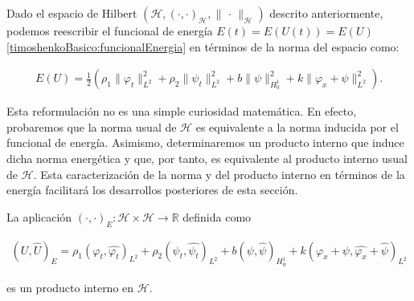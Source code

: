 Dado el espacio de Hilbert $(\mathcal{H}, (\cdot, \cdot)_{\mathcal{H}}, \lVert \, \cdot \, \rVert_{\mathcal{H}})$ descrito anteriormente, podemos reescribir el funcional de energía $E(t) = E(U(t)) = E(U)$ \eqref{timoshenkoBasico:funcionalEnergia} en términos de la norma del espacio como:

\begin{align}
    \label{timoshenkoBasico:funcionalEnergiaNorma}
    E(U) = \frac{1}{2}\left( \rho_1 \lVert \varphi_t \rVert^2_{L^2} + \rho_2 \lVert \psi_t \rVert_{L^2}^2 + b \lVert \psi \rVert_{H_0^1}^2 + k \lVert \varphi_x + \psi \rVert_{L^2}^2 \right).
\end{align}

Esta reformulación no es una simple curiosidad matemática. En efecto, 
probaremos que la norma usual de \(\mathcal{H}\) es equivalente a la 
norma inducida por el funcional de energía. Asimismo, determinaremos 
un producto interno que induce dicha norma energética y que, por tanto, 
es equivalente al producto interno usual de \(\mathcal{H}\). Esta 
caracterización de la norma y del producto interno en términos de la 
energía facilitará los desarrollos posteriores de esta sección.\\

\begin{Proposicion}
    \label{ch:teoriaVigas:prop:ProdInternoEnergia}

    La aplicación $(\cdot, \cdot)_{E} : \mathcal{H} \times \mathcal{H} \rightarrow \mathbb{R}$ definida como

    \begin{align}
        \label{prodInternoEnergiaH}
        (U, \hat{U})_{E} = \rho_1 (\varphi_t, \hat{\varphi_t})_{L^2} + \rho_2 (\psi_t, \hat{\psi_t})_{L^2} + b (\psi, \hat{\psi})_{H_0^1} + k (\varphi_x + \psi, \hat{\varphi_x} + \hat{\psi})_{L^2}
    \end{align}

    es un producto interno en $\mathcal{H}$.
\end{Proposicion}

